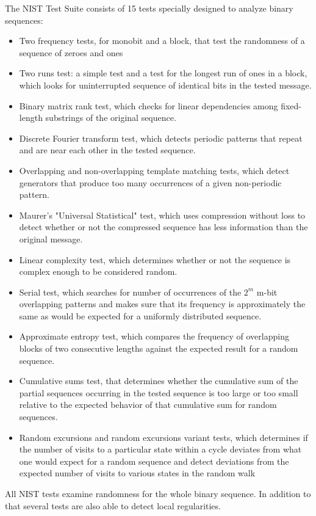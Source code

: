 \documentclass[conference]{IEEEtran}
\begin{document}
The NIST Test Suite consists of 15 tests specially designed to analyze
binary sequences:
\begin{itemize}
  \item Two frequency tests, for monobit and a block, that test the randomness of a sequence of zeroes and ones
  \item Two runs test: a simple test and a test for the longest run of ones in a block, which looks for uninterrupted sequence of identical bits in the tested message.
  \item Binary matrix rank test, which checks for linear dependencies among fixed-length substrings of the original sequence.
  \item Discrete Fourier transform test, which detects periodic  patterns that repeat and are near each other in the tested sequence.
  \item Overlapping and non-overlapping template matching tests, which detect generators that produce too many occurrences of a given non-periodic pattern.
  \item Maurer’s "Universal Statistical" test, which uses compression without loss to detect whether or not the compressed sequence has less information than the original message.
  \item Linear complexity test, which determines whether or not the sequence is complex enough to be considered random.
  \item Serial test,  which searches for number of occurrences of the $2^m$ m-bit overlapping patterns and makes sure that its frequency is approximately the same as would be expected for a uniformly distributed sequence.
   \item Approximate entropy test,  which compares the frequency of overlapping blocks of two consecutive lengths against the expected result for a random sequence.
   \item Cumulative sums test, that determines whether the cumulative sum of the partial sequences occurring in the tested sequence is too large or too small relative to the expected behavior of that cumulative sum for random sequences.
   \item Random excursions and random excursions variant tests, which determines if the number of visits to a particular state within a cycle deviates from what one would expect for a random sequence and detect deviations from the expected number of visits to various states in the random walk
  
\end{itemize}
 All NIST tests examine randomness for the whole binary sequence. In addition to that several tests are also able to detect local regularities. 
\end{document}

